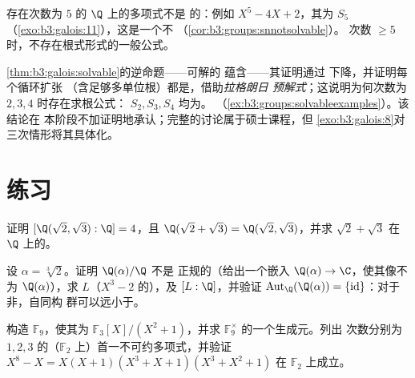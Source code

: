 \begin{corollary}[五次方程的不可解性]
\label{cor:b3:galois:quintic}
存在次数为 $5$ 的 $\Q$ 上的多项式不是
的：例如 $X^5 - 4X + 2$，其为
$S_5$（\cref{exo:b3:galois:11}），这是一个不
（\cref{cor:b3:groups:snnotsolvable}）。
次数 $\geq 5$ 时，不存在根式形式的一般公式。
\end{corollary}

\begin{remark}\label{rem:b3:galois:converse}
\cref{thm:b3:galois:solvable}的逆命题——可解的
蕴含——其证明通过
下降，并证明每个循环扩张
（含足够多单位根）都是，借助\emph{拉格朗日
预解式}；这说明为何次数为 $2, 3, 4$ 时存在求根公式：
$S_2, S_3, S_4$ 均为。
（\cref{ex:b3:groups:solvableexamples}）。该结论在
本阶段不加证明地承认；完整的讨论属于硕士课程，但
\cref{exo:b3:galois:8}对三次情形将其具体化。
\end{remark}

\section{练习}

\begin{exercise}[$\star$]\label{exo:b3:galois:1}
证明 $[\Q(\sqrt2, \sqrt3):\Q] = 4$，且 $\Q(\sqrt2 + \sqrt3) =
\Q(\sqrt2, \sqrt3)$，并求
$\sqrt2 + \sqrt3$ 在 $\Q$ 上的。
\end{exercise}

\begin{exercise}[$\star$]\label{exo:b3:galois:2}
设 $\alpha = \sqrt[3]2$。证明 $\Q(\alpha)/\Q$ 不是
正规的（给出一个嵌入 $\Q(\alpha) \to \C$，使其像不为
$\Q(\alpha)$），求 $L$（$X^3 -
2$ 的），及 $[L:\Q]$，并验证 $\operatorname{Aut}_\Q(\Q(\alpha)) =
\{\mathrm{id}\}$：对于非，自同构
群可以远小于。
\end{exercise}

\begin{exercise}[$\star$]\label{exo:b3:galois:3}
构造 $\mathbb F_9$，使其为 $\mathbb F_3[X]/(X^2+1)$，并求
$\mathbb F_9^\times$ 的一个生成元。列出
次数分别为 $1, 2, 3$ 的（$\mathbb F_2$ 上）首一不可约多项式，并验证
$X^8 - X = X(X+1)(X^3+X+1)(X^3+X^2+1)$ 在 $\mathbb F_2$ 上成立。
\end{exercise}

